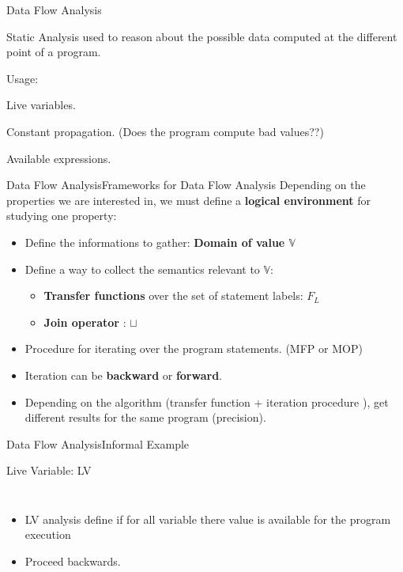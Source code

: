 \begin{frame}{Data Flow Analysis}
\begin{beameritemize}
	\item Static Analysis used to reason about the possible data computed at the different point of a program.
	\item Usage:
	 \begin{beameritemize}
		\item Live variables.
		\item Constant propagation. (Does the program compute bad values??)
		\item Available expressions.
	\end{beameritemize}
\end{beameritemize}
\end{frame}

\begin{frame}{Data Flow Analysis}{Frameworks for Data Flow Analysis}
Depending on the properties we are interested in, we must define a \textbf{logical environment} for studying one property:
\begin{itemize}
	\item Define the informations to gather: \textbf{Domain of value $\mathbb{V}$} 
	\item Define a way to collect the semantics relevant to $\mathbb{V}$:
	\begin{itemize}
		\item \textbf{Transfer functions} over the set of statement labels: \textbf{ $F_L$}
		\item \textbf{Join operator} : \textbf{$\sqcup$}
	\end{itemize}
	\item Procedure for iterating over the program statements. (MFP or MOP)
	\item Iteration can be \textbf{backward} or \textbf{forward}.
	\item Depending on the algorithm (transfer function + iteration procedure ), get different results for the same program (precision).
\end{itemize}
\end{frame}


\begin{frame}{Data Flow Analysis}{Informal Example}
\begin{exampleblock}{Live Variable: LV}
	\begin{columns}
		\begin{itemize}
			\item LV analysis define if for all variable there value is available for the program execution
			\item Proceed backwards.
		\end{itemize}
	
		
	\end{columns}	
	\end{exampleblock}
\end{frame}

